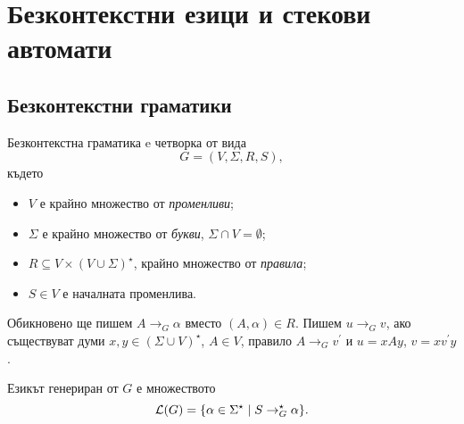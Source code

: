 \chapter{Безконтекстни езици и стекови автомати}


\section{Безконтекстни граматики}
\begin{dfn}
  Безконтекстна граматика e четворка от вида
  \[G = (V,\Sigma,R,S),\]
  където
  \begin{itemize}
  \item
    $V$ е крайно множество от {\em променливи};
  \item
    $\Sigma$ е крайно множество от {\em букви}, $\Sigma \cap V = \emptyset$;
  \item
    $R \subseteq V\times (V\cup\Sigma)^\star$, крайно множество от {\em правила};
  \item
    $S \in V$ е началната променлива. 
  \end{itemize}
  Обикновено ще пишем $A \rightarrow_G \alpha$ вместо $(A,\alpha) \in R$.
  Пишем $u \rightarrow_G v$, ако съществуват думи $x,y\in (\Sigma\cup V)^\star$, $A\in V$,
  правило $A\rightarrow_G v^\prime$ и $u = xAy$, $v = xv^\prime y$.
\end{dfn}


Езикът генериран от $G$ е множеството
\[\mathcal{L}(G) = \{\alpha\in\Sigma^\star\mid S \rightarrow^\star_G \alpha\}.\]
  
